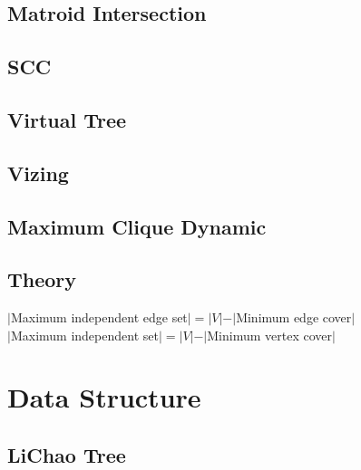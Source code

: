 \subsection{Matroid Intersection}

\subsection{SCC}

%
\subsection{Virtual Tree}

\subsection{Vizing}

\subsection{Maximum Clique Dynamic}


\subsection{Theory}
\begin{footnotesize}
$|$Maximum independent edge set$|=|V|-|$Minimum edge cover$|$\\
$|$Maximum independent set$|=|V|-|$Minimum vertex cover$|$\\
\end{footnotesize}

\section{Data Structure}
%
%
\subsection{LiChao Tree}

